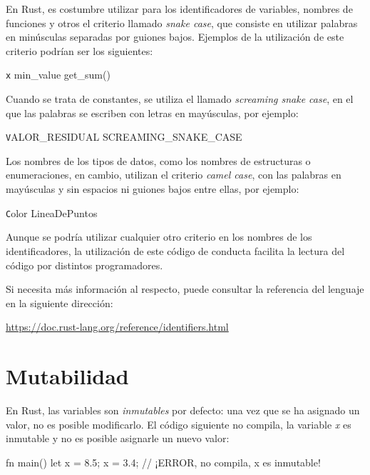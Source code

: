 En Rust, es costumbre utilizar para los identificadores de variables, nombres de funciones y otros el criterio llamado \textit{snake case}, que consiste en utilizar palabras en minúsculas separadas por guiones bajos. Ejemplos de la utilización de este criterio podrían ser los siguientes:

{\centering \texttt x \hspace{2em} min\_value \hspace{2em} get\_sum()\par}

Cuando se trata de constantes, se utiliza el llamado \textit{screaming snake case}, en el que las palabras se escriben con letras en mayúsculas, por ejemplo:

{\centering \texttt VALOR\_RESIDUAL \hspace{2em} SCREAMING\_SNAKE\_CASE \par}

Los nombres de los tipos de datos, como los nombres de estructuras o enumeraciones, en cambio, utilizan el criterio \textit{camel case}, con las palabras en mayúsculas y sin espacios ni guiones bajos entre ellas, por ejemplo:

{\centering \texttt Color \hspace{2em} LineaDePuntos \par}

Aunque se podría utilizar cualquier otro criterio en los nombres de los identificadores, la utilización de este código de conducta facilita la lectura del código por distintos programadores.

Si necesita más información al respecto, puede consultar la referencia del lenguaje en la siguiente dirección:

{\centering \small \url{https://doc.rust-lang.org/reference/identifiers.html} \par}

\section{Mutabilidad}
\noindent En Rust, las variables son \textit{inmutables} por defecto: una vez que se ha asignado un valor, no es posible modificarlo. El código siguiente no compila, la variable \textit{x} es inmutable y no es posible asignarle un nuevo valor:

\vspace{0.7em}
\begin{Codigo}
fn main() {
   let x = 8.5;
   x = 3.4; // ¡ERROR, no compila, x es inmutable!
}
\end{Codigo}


